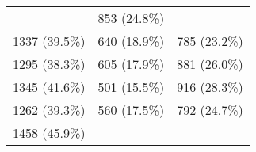 \documentclass[10pt,]{article}
\begin{document}
\begin{longtable}[c]{@{}ccc@{}}
\begin{minipage}[t]{0.22\columnwidth}
\strut\end{minipage} &
\begin{minipage}[t]{0.38\columnwidth}\centering\strut
853 (24.8\%)
\strut\end{minipage}\tabularnewline
\begin{minipage}[t]{0.23\columnwidth}\centering\strut
1337 (39.5\%)
\strut\end{minipage} &
\begin{minipage}[t]{0.22\columnwidth}\centering\strut
640 (18.9\%)
\strut\end{minipage} &
\begin{minipage}[t]{0.38\columnwidth}\centering\strut
785 (23.2\%)
\strut\end{minipage}\tabularnewline
\begin{minipage}[t]{0.23\columnwidth}\centering\strut
1295 (38.3\%)
\strut\end{minipage} &
\begin{minipage}[t]{0.22\columnwidth}\centering\strut
605 (17.9\%)
\strut\end{minipage} &
\begin{minipage}[t]{0.38\columnwidth}\centering\strut
881 (26.0\%)
\strut\end{minipage}\tabularnewline
\begin{minipage}[t]{0.23\columnwidth}\centering\strut
1345 (41.6\%)
\strut\end{minipage} &
\begin{minipage}[t]{0.22\columnwidth}\centering\strut
501 (15.5\%)
\strut\end{minipage} &
\begin{minipage}[t]{0.38\columnwidth}\centering\strut
916 (28.3\%)
\strut\end{minipage}\tabularnewline
\begin{minipage}[t]{0.23\columnwidth}\centering\strut
1262 (39.3\%)
\strut\end{minipage} &
\begin{minipage}[t]{0.22\columnwidth}\centering\strut
560 (17.5\%)
\strut\end{minipage} &
\begin{minipage}[t]{0.38\columnwidth}\centering\strut
792 (24.7\%)
\strut\end{minipage}\tabularnewline
\begin{minipage}[t]{0.23\columnwidth}\centering\strut
1458 (45.9\%)
\strut\end{minipage} &
\begin{minipage}[t]{0.22\columnwidth}\centering\strut

\end{minipage}
\end{longtable}
\end{document}
